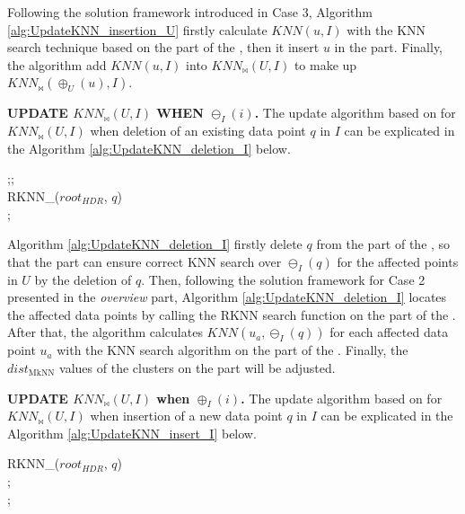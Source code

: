 Following the solution framework introduced in Case 3, Algorithm \ref{alg:UpdateKNN_insertion_U} firstly calculate $KNN(u,I)$ with the KNN search technique based on the \deltatree part of the \dualtree, then it insert $u$ in the \hdrtree part. Finally, the algorithm add $KNN(u,I)$ into $KNN_{\bowtie}(U,I)$ to make up $KNN_{\bowtie}(\oplus_{U}(u),I)$. 

\noindent\textbf{UPDATE \boldmath$KNN_{\bowtie}(U,I)$ WHEN $\ominus_{I}(i)$.} The update algorithm based on \dualtree for $KNN_{\bowtie}(U,I)$ when deletion of an existing data point $q$ in $I$ can be explicated in the Algorithm \ref{alg:UpdateKNN_deletion_I} below.

\begin{algorithm}[t]
\caption{KNN$_{\bowtie}$\_Deletion\_I($q$)}\label{alg:UpdateKNN_deletion_I}
;;\\
RKNN\_\dualtree($root_{HDR}$, $q$)\\
{
}   
;\\

\end{algorithm}

Algorithm \ref{alg:UpdateKNN_deletion_I} firstly delete $q$ from the \deltatree part of the \dualtree, so that the \deltatree part can ensure correct KNN search over $\ominus_{I}(q)$ for the affected points in $U$ by the deletion of $q$. Then, following the solution framework for Case 2 presented in the \textit{overview} part, Algorithm \ref{alg:UpdateKNN_deletion_I} locates the affected data points by calling the RKNN search function on the \hdrtree part of the \dualtree. After that, the algorithm calculates $KNN(u_a, \ominus_{I}(q))$ for each affected data point $u_a$ with the KNN search algorithm on the \deltatree part of the \dualtree. Finally, the $dist_{\text{MkNN}}$ values of the clusters on the \hdrtree part will be adjusted.



\noindent \textbf{UPDATE \boldmath$KNN_{\bowtie}(U,I)$ when $\oplus_{I}(i)$.} The update algorithm based on \dualtree for $KNN_{\bowtie}(U,I)$ when insertion of a new data point $q$ in $I$ can be explicated in the Algorithm \ref{alg:UpdateKNN_insert_I} below. 

\begin{algorithm}[t]
\caption{KNN$_{\bowtie}$\_Insertion\_I($q$)} 
\label{alg:UpdateKNN_insert_I}
RKNN\_\dualtree($root_{HDR}$, $q$)\\
{
}   
;\\
;\\

\end{algorithm}

